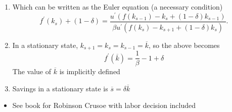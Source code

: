 \documentclass[notes=show]{beamer}
\begin{document}
\begin{frame}%


\begin{enumerate}
\item Which can be written as the Euler equation (a necessary condition)%
\[
f^{\prime }(k_{s})+(1-\delta )=\frac{u^{\prime }(f(k_{s-1})-k_{s}+(1-\delta
)k_{s-1})}{\beta u^{\prime }(f(k_{s})-k_{s+1}+(1-\delta )k_{s})}. 
\]

\item In a stationary state, $k_{s+1}=k_{s}=k_{s-1}=\overline{k}$, so the
above becomes%
\[
f^{\prime }(\overline{k})=\frac{1}{\beta }-1+\delta 
\]%
The value of $\overline{k}$ is implicitly defined

\item Savings in a stationary state is $\overline{s}=\delta \overline{k}$
\end{enumerate}

\begin{itemize}
\item See book for Robinson Crusoe with labor decision included
\end{itemize}

\end{frame}%
\end{document}
